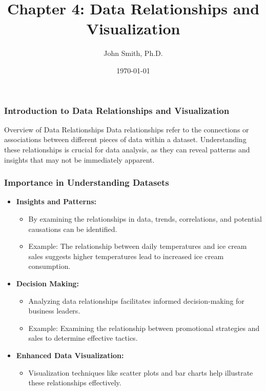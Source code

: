 \documentclass[aspectratio=169]{beamer}
\title[Chapter 4: Data Relationships and Visualization]{Chapter 4: Data Relationships and Visualization}
\author[J. Smith]{John Smith, Ph.D.}
\institute[University Name]{
  Department of Computer Science\\
  University Name\\
  \vspace{0.3cm}
  Email: email@university.edu\\
  Website: www.university.edu
}
\date{\today}
\begin{document}
\frame{\titlepage}

\begin{frame}[fragile]
    \frametitle{Introduction to Data Relationships and Visualization}
    \begin{block}{Overview of Data Relationships}
        Data relationships refer to the connections or associations between different pieces of data within a dataset. Understanding these relationships is crucial for data analysis, as they can reveal patterns and insights that may not be immediately apparent.
    \end{block}
\end{frame}

\begin{frame}[fragile]
    \frametitle{Importance in Understanding Datasets}
    \begin{itemize}
        \item \textbf{Insights and Patterns:}
            \begin{itemize}
                \item By examining the relationships in data, trends, correlations, and potential causations can be identified.
                \item Example: The relationship between daily temperatures and ice cream sales suggests higher temperatures lead to increased ice cream consumption.
            \end{itemize}
        \item \textbf{Decision Making:}
            \begin{itemize}
                \item Analyzing data relationships facilitates informed decision-making for business leaders.
                \item Example: Examining the relationship between promotional strategies and sales to determine effective tactics.
            \end{itemize}
        \item \textbf{Enhanced Data Visualization:}
            \begin{itemize}
                \item Visualization techniques like scatter plots and bar charts help illustrate these relationships effectively.
            \end{itemize}
    \end{itemize}
\end{frame}
\end{document}
